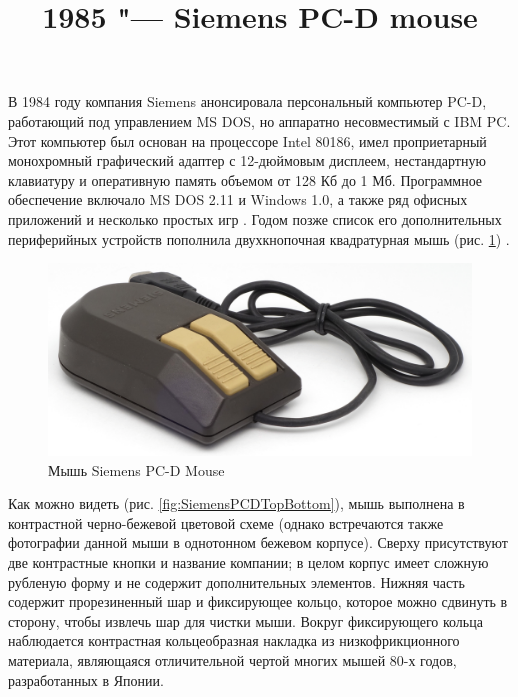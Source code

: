 \documentclass[11pt, a4paper]{article}
\begin{document}
\title{1985 "--- Siemens PC-D mouse}
\date{}
\maketitle
{}
В 1984 году компания Siemens анонсировала персональный компьютер PC-D, работающий под управлением MS DOS, но аппаратно несовместимый с IBM PC. Этот компьютер был основан на процессоре Intel 80186, имел проприетарный монохромный графический адаптер с 12-дюймовым дисплеем, нестандартную клавиатуру и оперативную память объемом от 128 Кб до 1 Мб. Программное обеспечение включало MS DOS 2.11 и Windows 1.0, а также ряд офисных приложений и несколько простых игр \cite{wiki}. Годом позже список его дополнительных периферийных устройств пополнила двухкнопочная квадратурная мышь (рис. \ref{fig:SiemensPCDPic}) \cite{blog, pinout}.

\begin{figure}[h]
    \centering
    \includegraphics[scale=0.6]{1985_siemens_pcd_mouse/pic_30.jpg}
    \caption{Мышь Siemens PC-D Mouse}
    \label{fig:SiemensPCDPic}
\end{figure}

Как можно видеть (рис. \ref{fig:SiemensPCDTopBottom}), мышь выполнена в контрастной черно-бежевой цветовой схеме (однако встречаются также фотографии данной мыши в однотонном бежевом корпусе). Сверху присутствуют две контрастные кнопки и название компании; в целом корпус имеет сложную рубленую форму и не содержит дополнительных элементов. Нижняя часть содержит прорезиненный шар и фиксирующее кольцо, которое можно сдвинуть в сторону, чтобы извлечь шар для чистки мыши. Вокруг фиксирующего кольца наблюдается контрастная кольцеобразная накладка из низкофрикционного материала, являющаяся отличительной чертой многих мышей 80-х годов, разработанных в Японии.
\end{document}
